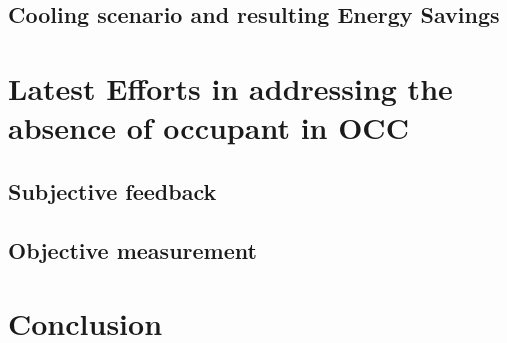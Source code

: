 \documentclass[review]{elsarticle}
\begin{document}
    \subsection{Cooling scenario and resulting Energy Savings}
    
%         
%         
\section{Latest Efforts in addressing the absence of occupant in OCC}
    \subsection{Subjective feedback}
    
    \subsection{Objective measurement}
    
\section{Conclusion}


\end{document}

